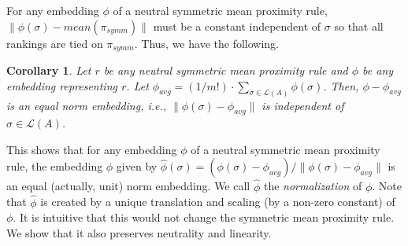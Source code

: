 \documentclass[10pt,letterpaper]{article}
\newcommand{\calL}{{\mathcal{L}}}
\newcommand{\rank}{{\calL(A)}}
\newtheorem{corollary}{Corollary}
\begin{document}
For any embedding $\phi$ of a neutral symmetric mean proximity rule, $\|\phi(\sigma)-mean(\pi_{symm})\|$ must be a constant independent of $\sigma$ so that all rankings are tied on $\pi_{symm}$. Thus, we have the following.
\begin{corollary}
Let $r$ be any neutral symmetric mean proximity rule and $\phi$ be any embedding representing $r$. Let $\phi_{avg} = (1/{m!}) \cdot \sum_{\sigma \in \rank} \phi(\sigma)$. Then, $\phi-\phi_{avg}$ is an equal norm embedding, i.e., $\|\phi(\sigma)-\phi_{avg}\|$ is independent of $\sigma \in \rank$. 
\label{cor:equal-dist}
\end{corollary}

This shows that for any embedding $\phi$ of a neutral symmetric mean proximity rule, the embedding $\hat{\phi}$ given by $\hat{\phi}(\sigma) = (\phi(\sigma)-\phi_{avg})/\|\phi(\sigma)-\phi_{avg}\|$ is an equal (actually, unit) norm embedding. We call $\hat{\phi}$ the \emph{normalization} of $\phi$. Note that $\hat{\phi}$ is created by a unique translation and scaling (by a non-zero constant) of $\phi$. It is intuitive that this would not change the symmetric mean proximity rule. We show that it also preserves neutrality and linearity. 

\end{document}
